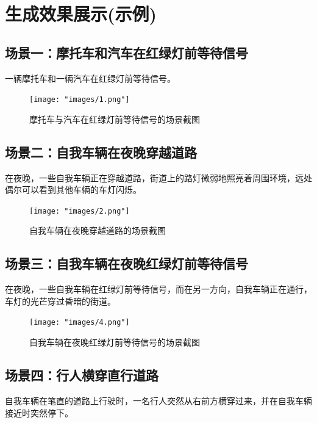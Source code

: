 \section{生成效果展示(示例)}

\subsection{场景一：摩托车和汽车在红绿灯前等待信号}
\indent 一辆摩托车和一辆汽车在红绿灯前等待信号。\\

\begin{figure}[H]
	\centering
	\texttt{[image: "images/1.png"]}
	\caption{摩托车与汽车在红绿灯前等待信号的场景截图}
	\label{fig:redlight_motorbike_car}
\end{figure}

\subsection{场景二：自我车辆在夜晚穿越道路}
\indent 在夜晚，一些自我车辆正在穿越道路，街道上的路灯微弱地照亮着周围环境，远处偶尔可以看到其他车辆的车灯闪烁。\\

\begin{figure}[H]
	\centering
	\texttt{[image: "images/2.png"]}
	\caption{自我车辆在夜晚穿越道路的场景截图}
	\label{fig:night_self_driving_cross}
\end{figure}

\subsection{场景三：自我车辆在夜晚红绿灯前等待信号}
\indent 在夜晚，一些自我车辆在红绿灯前等待信号，而在另一方向，自我车辆正在通行，车灯的光芒穿过昏暗的街道。\\

\begin{figure}[H]
	\centering
	\texttt{[image: "images/4.png"]}
	\caption{自我车辆在夜晚红绿灯前等待信号的场景截图}
	\label{fig:night_redlight_cross}
\end{figure}

\subsection{场景四：行人横穿直行道路}
\indent 自我车辆在笔直的道路上行驶时，一名行人突然从右前方横穿过来，并在自我车辆接近时突然停下。\\

